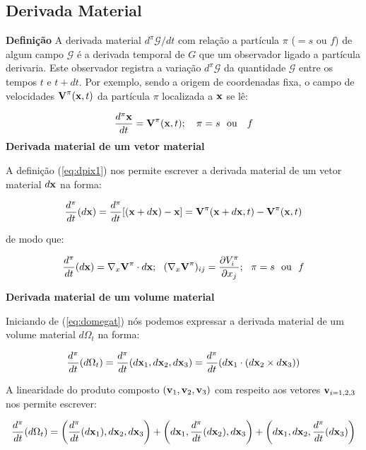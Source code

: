 \documentclass[
	11pt, %
	fleqn, %
	a4paper, %
]{LegrandOrangeBook}
\begin{document}
\subsection{Derivada Material}
\textbf{Definição}
A derivada material $d^\pi \mathcal{G}/dt$ com relação a partícula $\pi$ ($=s$ ou $f$) de algum campo $\mathcal{G}$ é a derivada temporal de $G$ que um observador ligado a partícula derivaria. Este observador registra a variação $d^\pi\mathcal{G}$ da quantidade $\mathcal{G}$ entre os tempos $t$ e $t+dt$. Por exemplo, sendo a origem de coordenadas fixa, o campo de velocidades $\textbf{V}^\pi(\textbf{x},t)$ da partícula $\pi$ localizada a $\textbf{x}$ se lê:

\begin{equation}
	\label{eq:dpix1}	
	\dfrac{d^\pi\textbf{x}}{dt} = \textbf{V}^\pi(\textbf{x},t); ~~~ \pi = s ~~\text{ou} ~~~f
\end{equation}
\textbf{Derivada material de um vetor material}

A definição (\ref{eq:dpix1}) nos permite escrever a derivada material de um vetor material $d\textbf{x}$ na forma:

\begin{equation}
	\label{eq:dpix2}	
	\dfrac{d^\pi}{dt}(d\textbf{x}) = \dfrac{d^\pi}{dt}[(\textbf{x}+d\textbf{x})-\textbf{x}]=\textbf{V}^\pi(\textbf{x}+d\textbf{x},t)- \textbf{V}^\pi(\textbf{x},t) 
\end{equation}

de modo que:

\begin{equation}
	\label{eq:dpix3}	
	\dfrac{d^\pi}{dt}(d\textbf{x}) = \nabla_x\textbf{V}^\pi \cdot d\textbf{x}; ~~ (\nabla_x \textbf{V}^\pi)_{ij} = \dfrac{\partial V_i^\pi}{\partial x_j}; ~~ \pi = s ~~ \text{ou} ~~ f
\end{equation}

\textbf{Derivada material de um volume material}

Iniciando de (\ref{eq:domegat}) nós podemos expressar a derivada material de um volume material $d\Omega_t$ na forma:

\begin{equation}
	\label{eq:derivadavolumematerial}	
	\dfrac{d^\pi}{dt}(d\Omega_t) = \dfrac{d^\pi}{dt}(d\textbf{x}_1,d\textbf{x}_2,d\textbf{x}_3) = \dfrac{d^\pi}{dt}(d\textbf{x}_1\cdot (d\textbf{x}_2 \times d\textbf{x}_3))
\end{equation}

A linearidade do produto composto $(\textbf{v}_1, \textbf{v}_2, \textbf{v}_3)$ com respeito aos vetores $\textbf{v}_{i=1,2,3}$ nos permite escrever: 

\begin{equation}
	\label{eq:derivadavolumematerial1}	
	\dfrac{d^\pi}{dt}(d\Omega_t) = \left(\dfrac{d^\pi}{dt}(d\textbf{x}_1),d\textbf{x}_2,d\textbf{x}_3\right) + \left(d\textbf{x}_1,\dfrac{d^\pi}{dt}(d\textbf{x}_2),d\textbf{x}_3\right)+\left(d\textbf{x}_1,d\textbf{x}_2,\dfrac{d^\pi}{dt}(d\textbf{x}_3)\right)
\end{equation}
\end{document}
